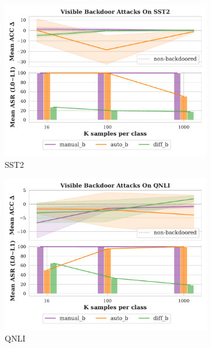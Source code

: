 \begin{figure}[!ht]
\begin{subfigure}{.33\textwidth}
  \centering
  \includegraphics[width=\linewidth]{figures/evaluation_media/SST2_score_n_attack.pdf}
  \caption{SST2}
  \label{fig:sst}
\end{subfigure}%
\begin{subfigure}{.33\textwidth}
  \centering
  \includegraphics[width=\linewidth]{figures/evaluation_media/QNLI_score_n_attack.pdf}
  \caption{QNLI}
  \label{fig:qnli}
\end{subfigure}%
\begin{subfigure}{.33\textwidth}
  \centering

\end{subfigure}
\end{figure}
